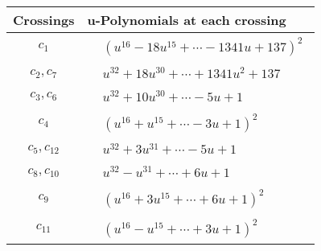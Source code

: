 \documentclass[1p]{elsarticle_modified}
\theoremstyle{definition}
\begin{document}
\begin{tabular}{m{50pt}|m{274pt}}
Crossings & \hspace{64pt}u-Polynomials at each crossing \\
\hline $$\begin{aligned}c_{1}\end{aligned}$$&$\begin{aligned}
&(u^{16}-18 u^{15}+\cdots-1341 u+137)^{2}
\end{aligned}$\\
\hline $$\begin{aligned}c_{2},c_{7}\end{aligned}$$&$\begin{aligned}
&u^{32}+18 u^{30}+\cdots+1341 u^2+137
\end{aligned}$\\
\hline $$\begin{aligned}c_{3},c_{6}\end{aligned}$$&$\begin{aligned}
&u^{32}+10 u^{30}+\cdots-5 u+1
\end{aligned}$\\
\hline $$\begin{aligned}c_{4}\end{aligned}$$&$\begin{aligned}
&(u^{16}+u^{15}+\cdots-3 u+1)^{2}
\end{aligned}$\\
\hline $$\begin{aligned}c_{5},c_{12}\end{aligned}$$&$\begin{aligned}
&u^{32}+3 u^{31}+\cdots-5 u+1
\end{aligned}$\\
\hline $$\begin{aligned}c_{8},c_{10}\end{aligned}$$&$\begin{aligned}
&u^{32}- u^{31}+\cdots+6 u+1
\end{aligned}$\\
\hline $$\begin{aligned}c_{9}\end{aligned}$$&$\begin{aligned}
&(u^{16}+3 u^{15}+\cdots+6 u+1)^{2}
\end{aligned}$\\
\hline $$\begin{aligned}c_{11}\end{aligned}$$&$\begin{aligned}
&(u^{16}- u^{15}+\cdots+3 u+1)^{2}
\end{aligned}$\\
\hline
\end{tabular}\\~\\
\end{document}

